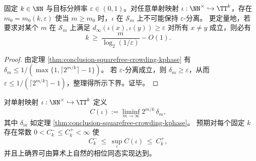 \begin{corollary}[固定相位维数与固定分辨率下的可审计性破裂]\label{cor:conclusion-squarefree-audit-breakdown}
固定 \(k\in\NN\) 与目标分辨率 \(\varepsilon\in(0,1)\)。对任意单射映射 \(\iota:\NN^\times\hookrightarrow\TT^k\)，存在 \(m_0=m_0(k,\varepsilon)\) 使当 \(m\ge m_0\) 时，\(\iota\) 在 \(\mathcal S_m\) 上不可能保持 \(\varepsilon\)-分离。
更定量地，若要求对某个 \(m\) 在 \(\mathcal S_m\) 上满足
\(
d_\infty(\iota(x),\iota(y))\ge \varepsilon
\)
对所有 \(x\neq y\) 成立，则必有
\[
k\ \ge\ \frac{m}{\log_2(1/\varepsilon)}-O(1).
\]
\end{corollary}

\begin{proof}
由定理 \ref{thm:conclusion-squarefree-crowding-kphase} 有 \(\delta_m\le 1/(\max\{1,\lceil 2^{m/k}\rceil-1\})\)。
若 \(\varepsilon\)-分离成立，则 \(\delta_m\ge \varepsilon\)，从而 \(\varepsilon\le 1/(\lceil 2^{m/k}\rceil-1)\)，整理得所示下界。证毕。
\end{proof}

\begin{conjecture}[平方自由层上的最优条件数常数]\label{conj:conclusion-squarefree-optimal-conditioning}
对单射映射 \(\iota:\NN^\times\hookrightarrow \TT^k\) 定义
\[
C(\iota):=\liminf_{m\to\infty} 2^{m/k}\,\delta_m,
\]
其中 \(\delta_m\) 如定理 \ref{thm:conclusion-squarefree-crowding-kphase}。
预期对每个固定 \(k\) 存在常数 \(0<C_k^-\le C_k^+<\infty\) 使
\[
C_k^-\ \le\ \sup_{\iota} C(\iota)\ \le\ C_k^+,
\]
并且上确界可由算术上自然的相位同态实现达到。
\end{conjecture}
